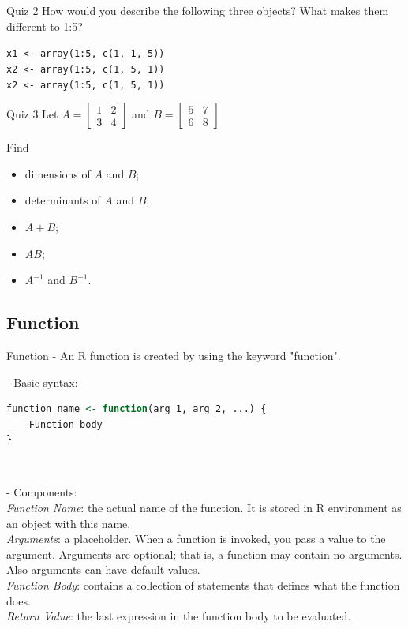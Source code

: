 \documentclass{beamer}
\begin{document}
\begin{frame}{Quiz 2}
How would you describe the following three objects? What makes them different to 1:5?\\
\hfill

\texttt{x1 <- array(1:5, c(1, 1, 5))}\\
\texttt{x2 <- array(1:5, c(1, 5, 1))}\\
\texttt{x2 <- array(1:5, c(1, 5, 1))}
\end{frame}

\begin{frame}{Quiz 3}
Let $A = \begin{bmatrix}
    1 & 2 \\
    3 & 4
  \end{bmatrix}$
and $B = \begin{bmatrix}
    5 & 7 \\
    6 & 8
  \end{bmatrix}$\\
\hfill

Find\\
\begin{itemize}
    \item dimensions of $A$ and $B$;
    \item determinants of $A$ and $B$;
    \item $A+B$;
    \item $AB$;
    \item $A^{-1}$ and $B^{-1}$.
\end{itemize}

\end{frame}

\subsection{Function}

\begin{frame}[fragile]{Function}
- An R function is created by using the keyword "function".\\
\hfill

- Basic syntax:
\begin{lstlisting}[language=R]
function_name <- function(arg_1, arg_2, ...) {
    Function body
}
\end{lstlisting}\\
\hfill

- Components:\\
\textit{Function Name}: the actual name of the function. It is stored in R environment as an object with this name.\\
\textit{Arguments}: a placeholder. When a function is invoked, you pass a value to the argument. Arguments are optional; that is, a function may contain no arguments. Also arguments can have default values.\\
\textit{Function Body}: contains a collection of statements that defines what the function does.\\
\textit{Return Value}: the last expression in the function body to be evaluated.

\end{frame}
\end{document}

